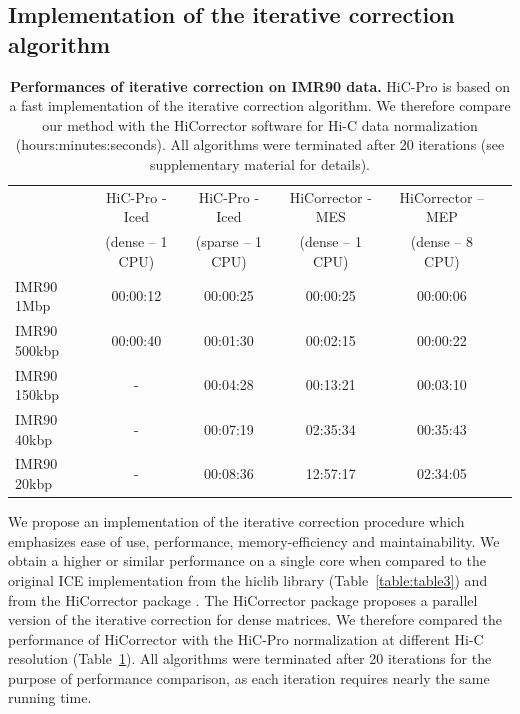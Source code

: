 \subsection{Implementation of the iterative correction algorithm}

\begin{table}
\begin{tabular}{lccccc}
\hline
& {\small HiC-Pro - Iced} & {\small HiC-Pro - Iced} & {\small HiCorrector -
MES} & {\small HiCorrector – MEP} \\
& {\footnotesize (dense – 1 CPU)} & {\footnotesize (sparse – 1 CPU)} & {\footnotesize (dense – 1
CPU)} & {\footnotesize (dense – 8 CPU)} \\
\hline
IMR90 1Mbp & 00:00:12 & 00:00:25 &00:00:25 & 00:00:06 \\
IMR90 500kbp & 00:00:40 & 00:01:30 & 00:02:15 & 00:00:22 \\
IMR90 150kbp & - & 00:04:28 & 00:13:21 & 00:03:10 \\
IMR90 40kbp & - & 00:07:19 & 02:35:34 & 00:35:43 \\
IMR90 20kbp & - & 00:08:36 & 12:57:17 & 02:34:05 \\
\end{tabular}
\caption{\textbf{Performances of iterative correction on IMR90 data.} HiC-Pro is based
on a fast implementation of the iterative correction algorithm. We therefore
compare our method with the HiCorrector software \citep{li:hi-corrector} for
Hi-C data normalization (hours:minutes:seconds). All algorithms were
terminated after 20 iterations (see supplementary material for details).}
\label{table:table4}
\end{table}

We propose an implementation of the iterative correction procedure which
emphasizes ease of use, performance, memory-efficiency and maintainability. We
obtain a higher or similar performance on a single core when compared to the
original ICE implementation from the hiclib library (Table~\ref{table:table3})
and from the HiCorrector package \citep{li:hi-corrector}. The HiCorrector
package proposes a parallel version of the iterative correction for dense
matrices. We therefore compared the performance of HiCorrector with the
HiC-Pro normalization at different Hi-C resolution (Table~\ref{table:table4}).
All algorithms were terminated after 20 iterations for the purpose of
performance comparison, as each iteration requires nearly the same running
time.

